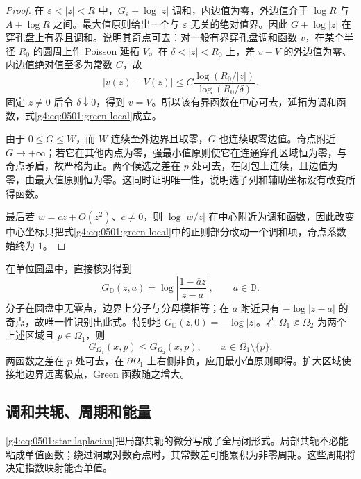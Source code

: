 \begin{proof}
	在 \(\varepsilon<|z|<R\) 中，\(G_\varepsilon+\log|z|\) 调和，内边值为零，外边值介于 \(\log R\) 与 \(A+\log R\) 之间。最大值原则给出一个与 \(\varepsilon\) 无关的绝对值界。因此 \(G+\log|z|\) 在穿孔盘上有界且调和。说明其奇点可去：对一般有界穿孔盘调和函数 \(v\)，在某个半径 \(R_0\) 的圆周上作 Poisson 延拓 \(V\)。在 \(\delta<|z|<R_0\) 上，差 \(v-V\) 的外边值为零、内边值绝对值至多为常数 \(C\)，故
	\[
		|v(z)-V(z)|\le C\frac{\log(R_0/|z|)}{\log(R_0/\delta)}.
	\]
	固定 \(z\ne0\) 后令 \(\delta\downarrow0\)，得到 \(v=V\)。所以该有界函数在中心可去，延拓为调和函数，式\eqref{g4:eq:0501:green-local}成立。

	由于 \(0\le G\le W\)，而 \(W\) 连续至外边界且取零，\(G\) 也连续取零边值。奇点附近 \(G\to+\infty\)；若它在其他内点为零，强最小值原则使它在连通穿孔区域恒为零，与奇点矛盾，故严格为正。两个候选之差在 \(p\) 处可去，在闭包上连续，且边值为零，由最大值原则恒为零。这同时证明唯一性，说明选子列和辅助坐标没有改变所得函数。

	最后若 \(w=cz+O(z^2)\)、\(c\ne0\)，则 \(\log|w/z|\) 在中心附近为调和函数，因此改变中心坐标只把式\eqref{g4:eq:0501:green-local}中的正则部分改动一个调和项，奇点系数始终为 \(1\)。
\end{proof}

\begin{example}
	\label{g4:exm:0501:disk-green}
	在单位圆盘中，直接核对得到
	\[
		G_{\mathbb D}(z,a)=\log\left|\frac{1-\overline a z}{z-a}\right|,
		\qquad a\in\mathbb D.
	\]
	分子在圆盘中无零点，边界上分子与分母模相等；在 \(a\) 附近只有 \(-\log|z-a|\) 的奇点，故唯一性识别出此式。特别地 \(G_{\mathbb D}(z,0)=-\log|z|\)。若 \(\Omega_1\Subset\Omega_2\) 为两个上述区域且 \(p\in\Omega_1\)，则
	\[
		G_{\Omega_1}(x,p)\le G_{\Omega_2}(x,p),\qquad x\in\Omega_1\setminus\{p\}.
	\]
	两函数之差在 \(p\) 处可去，在 \(\partial\Omega_1\) 上右侧非负，应用最小值原则即得。扩大区域使接地边界远离极点，Green 函数随之增大。
\end{example}

\subsection{调和共轭、周期和能量}
\label{g4:subsec:0501:04}

\cref{g4:eq:0501:star-laplacian}把局部共轭的微分写成了全局闭形式。局部共轭不必能粘成单值函数；绕过洞或对数奇点时，其常数差可能累积为非零周期。这些周期将决定指数映射能否单值。

